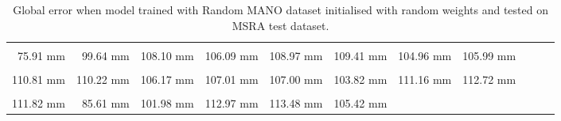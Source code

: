 \begin{table}[!ht]
    \begin{tabular}{|c|c|c|c|c|c|c|c|c|c|c|}
    \hline
    \cellcolor[HTML]{ff7500}{\bfseries Wrist} & \cellcolor[HTML]{ff0000}{\bfseries IMCP} & \cellcolor[HTML]{ff0000}{\bfseries IPIP} & \cellcolor[HTML]{ff0000}{\bfseries IDIP} & \cellcolor[HTML]{ff0000}{\bfseries ITIP} & \cellcolor[HTML]{ff0000}{\bfseries MMCP} & \cellcolor[HTML]{ff0000}{\bfseries MPIP} & \cellcolor[HTML]{ff0000}{\bfseries MDIP}  \\
    \cellcolor[HTML]{ff7500}$\,\,\,$75.91 mm & \cellcolor[HTML]{ff0000}$\,\,\,$99.64 mm & \cellcolor[HTML]{ff0000}108.10 mm & \cellcolor[HTML]{ff0000}106.09 mm & \cellcolor[HTML]{ff0000}108.97 mm & \cellcolor[HTML]{ff0000}109.41 mm & \cellcolor[HTML]{ff0000}104.96 mm & \cellcolor[HTML]{ff0000}105.99 mm\\
    \hline
    \cellcolor[HTML]{ff0000}{\bfseries MTIP} & \cellcolor[HTML]{ff0000}{\bfseries RMCP} & \cellcolor[HTML]{ff0000}{\bfseries RPIP} & \cellcolor[HTML]{ff0000}{\bfseries RDIP} & \cellcolor[HTML]{ff0000}{\bfseries RTIP} & \cellcolor[HTML]{ff0000}{\bfseries PMCP} & \cellcolor[HTML]{ff0000}{\bfseries PPIP} & \cellcolor[HTML]{ff0000}{\bfseries PDIP}  \\
    \cellcolor[HTML]{ff0000}110.81 mm & \cellcolor[HTML]{ff0000}110.22 mm & \cellcolor[HTML]{ff0000}106.17 mm & \cellcolor[HTML]{ff0000}107.01 mm & \cellcolor[HTML]{ff0000}107.00 mm & \cellcolor[HTML]{ff0000}103.82 mm & \cellcolor[HTML]{ff0000}111.16 mm & \cellcolor[HTML]{ff0000}112.72 mm\\
    \hline
    \cellcolor[HTML]{ff0000}{\bfseries PTIP} & \cellcolor[HTML]{ff2500}{\bfseries TMCP} & \cellcolor[HTML]{ff0000}{\bfseries TPIP} & \cellcolor[HTML]{ff0000}{\bfseries PDIP} & \cellcolor[HTML]{ff0000}{\bfseries TTIP} & \cellcolor[HTML]{ff0000}{\bfseries Average}  \\
    \cellcolor[HTML]{ff0000}111.82 mm & \cellcolor[HTML]{ff2500}$\,\,\,$85.61 mm & \cellcolor[HTML]{ff0000}101.98 mm & \cellcolor[HTML]{ff0000}112.97 mm & \cellcolor[HTML]{ff0000}113.48 mm & \cellcolor[HTML]{ff0000}105.42 mm \\
    \cline{1-6}
    \end{tabular}
    \caption{Global error when model trained with Random MANO dataset initialised with random weights and tested on MSRA test dataset.}
    \label{tb:orag}
    \end{table}
